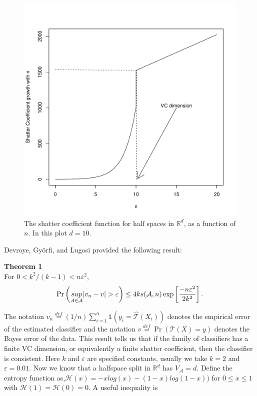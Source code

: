\begin{figure}[h]
\centering
  \includegraphics[scale=0.7]{figures/phase_change_shatter_dynamics2.pdf}
  \caption[A shatter coefficient plot]{The shatter coefficient function for half spaces in $\mathbb{R}^d$, as a function of $n$. In this plot $d=10$.}\label{fig:phase_change_shatter_dynamics}
\end{figure}

Devroye, Gy\"{o}rfi, and Lugosi \cite{devroye1996probabilistic} provided the following result: 

\noindent \textbf{Theorem 1}\\
For $0<k^2 /(k-1)< n\varepsilon^2$,
\begin{equation}\label{eqn:vcb}
\Pr\left(\underset{A\in \mathcal{A}}{sup} \vert v_n -v\vert > \varepsilon\right) \leq 4ks(\mathcal{A},n)\exp\vspace{-.1in}\left[\frac{-n\varepsilon^2}{2k^2}\right].
\end{equation}

The notation $v_n \overset{def}{=}(1/n)\sum_{i=1}^n\mathds{1}(y_i =\hat{\mathcal{T}}(X_i))$ denotes the empirical error of the estimated classifier and the notation $v\overset{def}{=}\Pr(\mathcal{T}(X)=y)$ denotes the Bayes error of the data. This result tells us that if the family of classifiers has a finite VC dimension, or equivalently a finite shatter coefficient, then the classifier is consistent. Here $k$ and $\varepsilon$ are specified constants, usually we take $k=2$ and $\varepsilon=0.01$. Now we know that a halfspace split in $\mathbb{R}^d$ has $V_\mathcal{A}=d$. Define the entropy function as,$\mathcal{H}(x) = -xlog(x) -(1-x)log(1-x))$ for $0 \leq x \leq 1$ with $\mathcal{H}(1)=\mathcal{H}(0)=0$. A useful inequality is 

